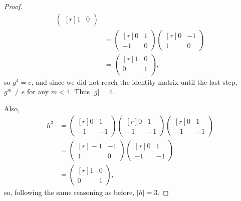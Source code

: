 \documentclass{article}
\theoremstyle{definition}
\begin{document}
\begin{proof}
\begin{align*}
\begin{pmatrix*}[r]
			                                    1 & 0
		                                    \end{pmatrix*}               \\
		    & = \begin{pmatrix*}[r]
			        0 & 1 \\
			        -1 & 0
		        \end{pmatrix*}\begin{pmatrix*}[r]
			                      0 & -1 \\
			                      1 & 0
		                      \end{pmatrix*}                             \\
		    & = \begin{pmatrix*}[r]
			        1 & 0 \\
			        0 & 1 \\
		        \end{pmatrix*},
	\end{align*}
	so $g^4 = e$, and since we did not reach the identity matrix until the last step, $g^m \neq e$ for any $m < 4$.
	Thus $|g| = 4$.

	Also, \begin{align*}
		h^3 & = \begin{pmatrix*}[r]
			        0 & 1 \\
			        -1 & -1
		        \end{pmatrix*}\begin{pmatrix*}[r]
			                      0 & 1 \\
			                      -1 & -1
		                      \end{pmatrix*}\begin{pmatrix*}[r]
			                                    0 & 1 \\
			                                    -1 & -1
		                                    \end{pmatrix*} \\
		    & = \begin{pmatrix*}[r]
			        -1 & -1 \\
			        1 & 0
		        \end{pmatrix*}\begin{pmatrix*}[r]
			                      0 & 1 \\
			                      -1 & -1
		                      \end{pmatrix*}               \\
		    & = \begin{pmatrix*}[r]
			        1 & 0 \\
			        0 & 1
		        \end{pmatrix*},
	\end{align*}
	so, following the same reasoning as before, $|h| = 3$.


\end{proof}
\end{document}
